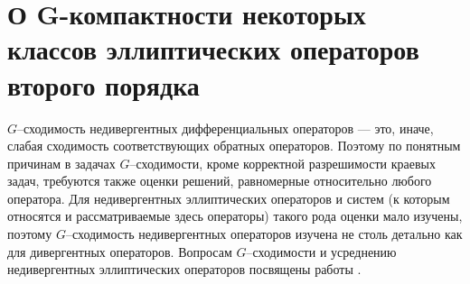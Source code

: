 

\chapter{О G-компактности некоторых классов эллиптических операторов второго порядка}

%



$G$--сходимость недивергентных дифференциальных операторов --- это, иначе, слабая сходимость
соответствующих обратных операторов. Поэтому по понятным причинам в задачах
$G$--сходимости,
кроме корректной разрешимости краевых задач, требуются также оценки решений,
равномерные относительно любого оператора. Для недивергентных эллиптических
операторов и систем (к которым относятся и рассматриваемые здесь операторы)
такого рода оценки мало изучены, поэтому $G$--сходимость
недивергентных операторов изучена не столь детально как для дивергентных операторов.
Вопросам $G$--сходимости и усреднению недивергентных эллиптических операторов
посвящены работы \cite{smm_ZhS, smm_ZhS1, smm_Sir1, smm_Sir}.

